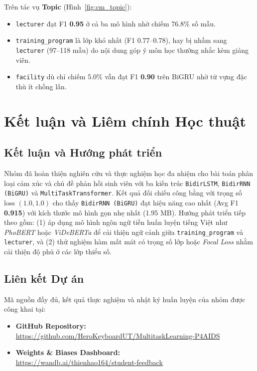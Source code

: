 \documentclass[a4paper,12pt]{article}
\begin{document}
Trên tác vụ \textbf{Topic} (Hình~\ref{fig:cm_topic}):
\begin{itemize}
    \item \texttt{lecturer} đạt F1 \textbf{0.95} ở cả ba mô hình nhờ chiếm 76.8\% số mẫu.
    \item \texttt{training\_program} là lớp khó nhất (F1 $0.77$--$0.78$), hay bị nhầm sang \texttt{lecturer} (97--118 mẫu) do nội dung góp ý môn học thường nhắc kèm giảng viên.
    \item \texttt{facility} dù chỉ chiếm 5.0\% vẫn đạt F1 \textbf{0.90} trên BiGRU nhờ từ vựng đặc thù ít chồng lấn.
\end{itemize}

\section{Kết luận và Liêm chính Học thuật}

\subsection{Kết luận và Hướng phát triển}
Nhóm đã hoàn thiện nghiên cứu và thực nghiệm học đa nhiệm cho bài toán phân loại cảm xúc và chủ đề phản hồi sinh viên với ba kiến trúc \texttt{BidirLSTM}, \texttt{BidirRNN (BiGRU)} và \texttt{MultiTaskTransformer}. Kết quả đối chiếu công bằng với trọng số loss $(1.0, 1.0)$ cho thấy \texttt{BidirRNN (BiGRU)} đạt hiệu năng cao nhất (Avg F1 \textbf{0.915}) với kích thước mô hình gọn nhẹ nhất (1.95 MB). Hướng phát triển tiếp theo gồm: (1) áp dụng mô hình ngôn ngữ tiền huấn luyện tiếng Việt như \textit{PhoBERT} hoặc \textit{ViDeBERTa} để cải thiện ngữ cảnh giữa \texttt{training\_program} và \texttt{lecturer}, và (2) thử nghiệm hàm mất mát có trọng số lớp hoặc \textit{Focal Loss} nhằm cải thiện độ phủ ở các lớp thiểu số.

\subsection{Liên kết Dự án}
Mã nguồn đầy đủ, kết quả thực nghiệm và nhật ký huấn luyện của nhóm được công khai tại:
\begin{itemize}
    \item \textbf{GitHub Repository:}\\
    {\small\url{https://github.com/HeroKeyboardUT/MultitaskLearning-P4AIDS}}
    \item \textbf{Weights \& Biases Dashboard:}\\
    {\small\href{https://wandb.ai/thienhao164/student-feedback?nw=nwuserthienhao164}{https://wandb.ai/thienhao164/student-feedback}}
\end{itemize}
\end{document}
